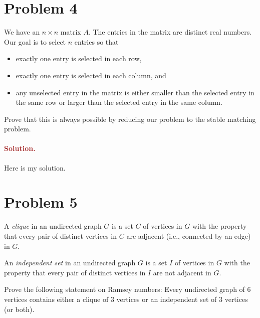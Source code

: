 \section*{Problem 4}
We have an $n \times n$ matrix $A$. The entries in the matrix are distinct real numbers. Our goal is to select $n$ entries so that
\begin{itemize}
    \item exactly one entry is selected in each row,
    \item exactly one entry is selected in each column, and
    \item any unselected entry in the matrix is either smaller than the selected entry in the same row or larger than the selected entry in the same column.
\end{itemize}
Prove that this is always possible by reducing our problem to the stable matching problem.

\paragraph{\textcolor{brown}{Solution.}}
Here is my solution.

\section*{Problem 5}
A \emph{clique} in an undirected graph $G$ is a set $C$ of vertices in $G$ with the property that every pair of distinct vertices in $C$ are adjacent (i.e., connected by an edge) in $G$.

An \emph{independent set} in an undirected graph $G$ is a set $I$ of vertices in $G$ with the property that every pair of distinct vertices in $I$ are not adjacent in $G$.

Prove the following statement on Ramsey numbers: Every undirected graph of $6$ vertices contains either a clique of $3$ vertices or an independent set of $3$ vertices (or both).

